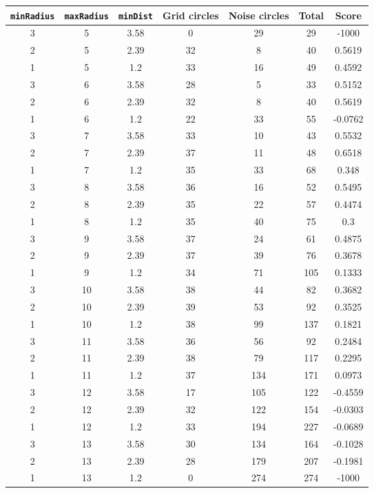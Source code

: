 \documentclass[letterpaper, 12pt]{article}
\begin{document}
\begin{longtable}{|c|c|c|c|c|c|c|}
\hline
\textbf{\texttt{minRadius}} & \textbf{\texttt{maxRadius}} & \textbf{\texttt{minDist}} & \textbf{Grid circles} & \textbf{Noise circles} & \textbf{Total} & \textbf{Score} \\
\hline
3 & 5 & 3.58 & 0 & 29 & 29 & -1000 \\
\hline
2 & 5 & 2.39 & 32 & 8 & 40 & 0.5619 \\
\hline
1 & 5 & 1.2 & 33 & 16 & 49 & 0.4592 \\
\hline
3 & 6 & 3.58 & 28 & 5 & 33 & 0.5152 \\
\hline
2 & 6 & 2.39 & 32 & 8 & 40 & 0.5619 \\
\hline
1 & 6 & 1.2 & 22 & 33 & 55 & -0.0762 \\
\hline
3 & 7 & 3.58 & 33 & 10 & 43 & 0.5532 \\
\hline
2 & 7 & 2.39 & 37 & 11 & 48 & 0.6518 \\
\hline
1 & 7 & 1.2 & 35 & 33 & 68 & 0.348 \\
\hline
3 & 8 & 3.58 & 36 & 16 & 52 & 0.5495 \\
\hline
2 & 8 & 2.39 & 35 & 22 & 57 & 0.4474 \\
\hline
1 & 8 & 1.2 & 35 & 40 & 75 & 0.3 \\
\hline
3 & 9 & 3.58 & 37 & 24 & 61 & 0.4875 \\
\hline
2 & 9 & 2.39 & 37 & 39 & 76 & 0.3678 \\
\hline
1 & 9 & 1.2 & 34 & 71 & 105 & 0.1333 \\
\hline
3 & 10 & 3.58 & 38 & 44 & 82 & 0.3682 \\
\hline
2 & 10 & 2.39 & 39 & 53 & 92 & 0.3525 \\
\hline
1 & 10 & 1.2 & 38 & 99 & 137 & 0.1821 \\
\hline
3 & 11 & 3.58 & 36 & 56 & 92 & 0.2484 \\
\hline
2 & 11 & 2.39 & 38 & 79 & 117 & 0.2295 \\
\hline
1 & 11 & 1.2 & 37 & 134 & 171 & 0.0973 \\
\hline
3 & 12 & 3.58 & 17 & 105 & 122 & -0.4559 \\
\hline
2 & 12 & 2.39 & 32 & 122 & 154 & -0.0303 \\
\hline
1 & 12 & 1.2 & 33 & 194 & 227 & -0.0689 \\
\hline
3 & 13 & 3.58 & 30 & 134 & 164 & -0.1028 \\
\hline
2 & 13 & 2.39 & 28 & 179 & 207 & -0.1981 \\
\hline
1 & 13 & 1.2 & 0 & 274 & 274 & -1000 \\

\end{longtable}
\end{document}
